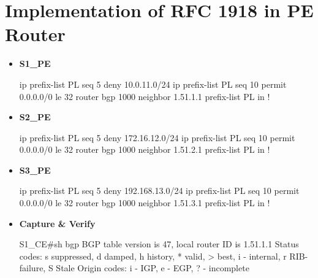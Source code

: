 \documentclass[10pt]{article}
\begin{document}
\section{Implementation of RFC 1918 in PE Router} %
\label{sec:implementation_of_rfc_1918_in_pe_router}
\begin{itemize}
	\item {\bf S1\_PE}
	\begin{verbatim*}
		ip prefix-list PL seq 5 deny 10.0.11.0/24
		ip prefix-list PL seq 10 permit 0.0.0.0/0 le 32
		router bgp 1000
		 neighbor 1.51.1.1 prefix-list PL in
		!
	\end{verbatim*}
	\item {\bf S2\_PE}
	\begin{verbatim*}
		ip prefix-list PL seq 5 deny 172.16.12.0/24
		ip prefix-list PL seq 10 permit 0.0.0.0/0 le 32
		router bgp 1000
		 neighbor 1.51.2.1 prefix-list PL in
		!
	\end{verbatim*}
	\item {\bf S3\_PE}
	\begin{verbatim*}
		ip prefix-list PL seq 5 deny 192.168.13.0/24
		ip prefix-list PL seq 10 permit 0.0.0.0/0 le 32
		router bgp 1000
		 neighbor 1.51.3.1 prefix-list PL in
		!
	\end{verbatim*}
	\item {\bf Capture \& Verify}
	\begin{verbatim*}
		S1_CE#sh bgp
		BGP table version is 47, local router ID is 1.51.1.1
		Status codes: s suppressed, d damped, h history, * valid, > best, i - internal,
		              r RIB-failure, S Stale
		Origin codes: i - IGP, e - EGP, ? - incomplete


\end{verbatim*}
\end{itemize}
\end{document}
